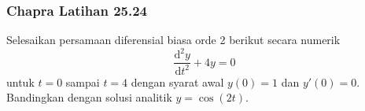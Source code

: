 \begin{frame}
\frametitle{Chapra Latihan 25.24}

Selesaikan persamaan diferensial biasa orde 2 berikut secara numerik
\begin{equation*}
\frac{\mathrm{d}^2 y}{\mathrm{d}t^2} + 4y = 0
\end{equation*}
untuk $t = 0$ sampai $t=4$
dengan syarat awal $y(0) = 1$ dan $y'(0) = 0$.
Bandingkan dengan solusi analitik $y = \cos(2t)$.

\end{frame}


